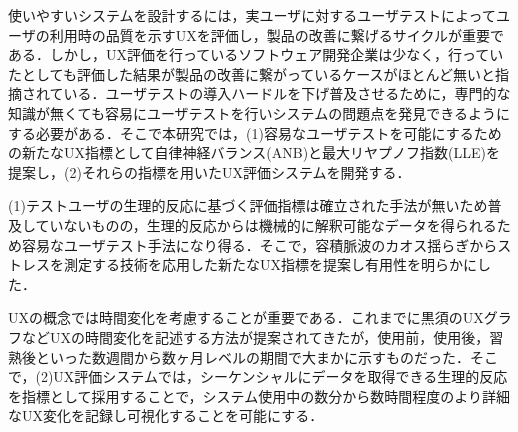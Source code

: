 
\begin{jabstract}

使いやすいシステムを設計するには，実ユーザに対するユーザテストによってユーザの利用時の品質を示すUXを評価し，製品の改善に繋げるサイクルが重要である．しかし，UX評価を行っているソフトウェア開発企業は少なく，行っていたとしても評価した結果が製品の改善に繋がっているケースがほとんど無いと指摘されている．ユーザテストの導入ハードルを下げ普及させるために，専門的な知識が無くても容易にユーザテストを行いシステムの問題点を発見できるようにする必要がある．そこで本研究では，(1)容易なユーザテストを可能にするための新たなUX指標として自律神経バランス(ANB)と最大リヤプノフ指数(LLE)を提案し，(2)それらの指標を用いたUX評価システムを開発する．

(1)テストユーザの生理的反応に基づく評価指標は確立された手法が無いため普及していないものの，生理的反応からは機械的に解釈可能なデータを得られるため容易なユーザテスト手法になり得る．そこで，容積脈波のカオス揺らぎからストレスを測定する技術を応用した新たなUX指標を提案し有用性を明らかにした．

UXの概念では時間変化を考慮することが重要である．これまでに黒須のUXグラフなどUXの時間変化を記述する方法が提案されてきたが，使用前，使用後，習熟後といった数週間から数ヶ月レベルの期間で大まかに示すものだった．そこで，(2)UX評価システムでは，シーケンシャルにデータを取得できる生理的反応を指標として採用することで，システム使用中の数分から数時間程度のより詳細なUX変化を記録し可視化することを可能にする．

\end{jabstract}


